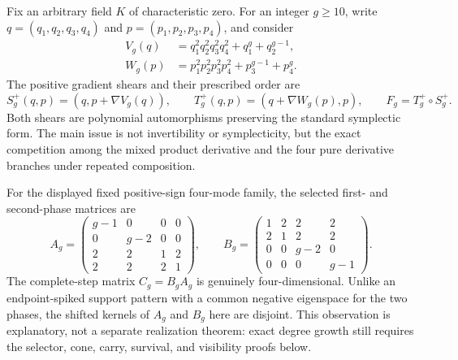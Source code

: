 \documentclass[11pt]{article}
\theoremstyle{remark}
\numberwithin{equation}{section}
\begin{document}
Fix an arbitrary field \(K\) of characteristic zero.  For an integer
\(g\geq10\), write \(q=(q_1,q_2,q_3,q_4)\) and
\(p=(p_1,p_2,p_3,p_4)\), and consider
\begin{equation}\label{eq:intro-potentials}
\begin{aligned}
V_g(q)&=q_1^2q_2^2q_3^2q_4^2+q_1^g+q_2^{g-1},\\
W_g(p)&=p_1^2p_2^2p_3^2p_4^2+p_3^{g-1}+p_4^g.
\end{aligned}
\end{equation}
The positive gradient shears and their prescribed order are
\begin{equation}\label{eq:intro-map}
S_g^+(q,p)=(q,p+\nabla V_g(q)),\qquad
T_g^+(q,p)=(q+\nabla W_g(p),p),\qquad
F_g=T_g^+\circ S_g^+.
\end{equation}
Both shears are polynomial automorphisms preserving the standard symplectic
form.  The main issue is not invertibility or symplecticity, but the exact
competition among the mixed product derivative and the four pure derivative
branches under repeated composition.

For the displayed fixed positive-sign four-mode family, the selected
first- and second-phase matrices are
\begin{equation}\label{eq:intro-phase-matrices}
A_g=
\begin{pmatrix}
g-1&0&0&0\\
0&g-2&0&0\\
2&2&1&2\\
2&2&2&1
\end{pmatrix},
\qquad
B_g=
\begin{pmatrix}
1&2&2&2\\
2&1&2&2\\
0&0&g-2&0\\
0&0&0&g-1
\end{pmatrix}.
\end{equation}
The complete-step matrix \(C_g=B_gA_g\) is genuinely four-dimensional.
Unlike an endpoint-spiked support pattern with a common negative
eigenspace for the two phases, the shifted kernels of \(A_g\) and \(B_g\)
here are disjoint.  This observation is explanatory, not a separate
realization theorem: exact degree growth still requires the selector, cone,
carry, survival, and visibility proofs below.
\end{document}
